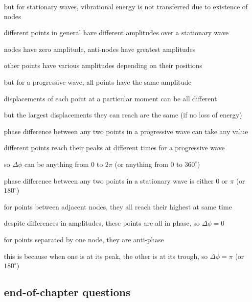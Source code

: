 but for stationary waves, vibrational energy is not transferred due to existence of nodes

\cmt different points in general have different amplitudes over a stationary wave

\hspace*{1.25em} nodes have zero amplitude, anti-nodes have greatest amplitudes

\hspace*{1.25em} other points have various amplitudes depending on their positions

but for a progressive wave, all points have the same amplitude

\hspace*{1.25em} displacements of each point at a particular moment can be all different

\hspace*{1.25em} but the largest displacements they can reach are the same (if no loss of energy)

\cmt phase difference between any two points in a progressive wave can take any value

\hspace*{1.25em} different points reach their peaks at different times for a progressive wave

\hspace*{1.25em} so $\Delta \phi$ can be anything from 0 to $2\pi$ (or anything from 0 to $360^\circ$)

phase difference between any two points in a stationary wave is either 0 or $\pi$ (or $180^\circ$)

\hspace*{1.25em} for points between adjacent nodes, they all reach their highest at same time

\hspace*{1.25em} despite differences in amplitudes, these points are all in phase, so $\Delta \phi=0$

\hspace*{1.25em} for points separated by one node, they are anti-phase

\hspace*{1.25em} this is because when one is at its peak, the other is at its trough, so $\Delta \phi = \pi$ (or $180^\circ$)


	
\subsection{end-of-chapter questions}


